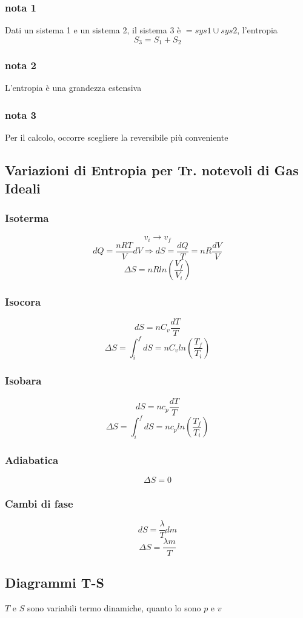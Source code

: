 \documentclass[a4paper]{report}
\begin{document}
  \subsubsection{nota 1}
  Dati un sistema 1 e un sistema 2, il sistema 3 è $= sys1 \cup sys2$, l'entropia
  \[ S_3 = S_1 + S_2 \]
  \subsubsection{nota 2}
  L'entropia è una grandezza estensiva
  \subsubsection{nota 3}
  Per il calcolo, occorre scegliere la reversibile più conveniente
  \subsection{Variazioni di Entropia per Tr. notevoli di Gas Ideali}
  \subsubsection{Isoterma}
  \[ v_i \rightarrow v_f\]
  \[ dQ = \frac{nRT}{V} dV \Rightarrow dS = \frac{dQ}{T} = nR\frac{dV}{V} \]
  \[ \Delta S = nR ln(\frac{V_f}{V_i}) \]

  \subsubsection{Isocora}
  \[ dS = nC_v\frac{dT}{T} \]
  \[ \Delta S = \int_i^f dS = nC_v ln(\frac{T_f}{T_i}) \]

  \subsubsection{Isobara}
  \[ dS = nc_p\frac{dT}{T} \]
  \[ \Delta S = \int_i^f dS = n c_p ln(\frac{T_f}{T_i})\]

  \subsubsection{Adiabatica}
  \[ \Delta S = 0 \]

  \subsubsection{Cambi di fase}
  \[ dS = \frac{\lambda}{T} dm\]
  \[ \Delta S = \frac{\lambda m}{T} \]

  \subsection{Diagrammi T-S}
  $T$ e $S$ sono variabili termo dinamiche, quanto lo sono $p$ e $v$
\end{document}
